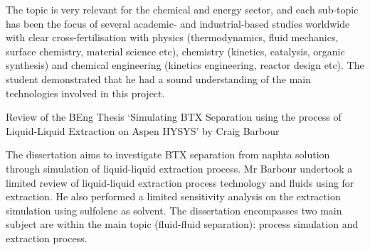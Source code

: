 \documentclass[14pt,twoside]{report}
\begin{document}
The topic is very relevant for the chemical and energy sector, and each sub-topic has been the focus of several academic- and industrial-based studies worldwide with clear cross-fertilisation with physics (thermodynamics, fluid mechanics, surface chemistry, material science etc), chemistry (kinetics, catalysis, organic synthesis) and chemical engineering (kinetics engineering, reactor design etc). The student demonstrated that he had a sound understanding of the main technologies involved in this project.



\clearpage




\bigskip

\begin{center}
  {\Large Review of the BEng Thesis `Simulating BTX Separation using the process of Liquid-Liquid Extraction on Aspen HYSYS' by Craig Barbour}
\end{center}
The dissertation aims to investigate BTX separation from naphta solution through simulation of liquid-liquid extraction process. Mr Barbour undertook a limited review of liquid-liquid extraction process technology and fluids using for extraction. He also performed a limited sensitivity analysis on the extraction simulation using sulfolene as solvent. The dissertation encompasses two main subject are within the main topic (fluid-fluid separation): process simulation and extraction process.
\end{document}
